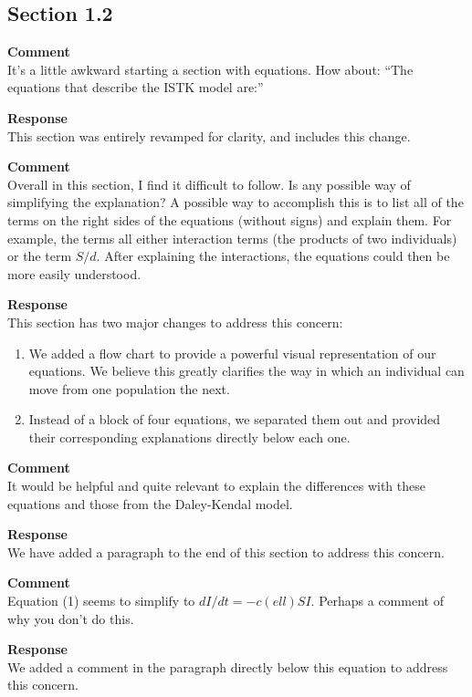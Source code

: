 \subsection{Section 1.2}
\setcounter{rev2-1.3}{1}

\textbf{Comment } \\
It’s a little awkward starting a section with equations. How about: ``The equations that describe the ISTK model are:''

\textbf{Response } \\
This section was entirely revamped for clarity, and includes this change.

\textbf{Comment } \\
Overall in this section, I find it difficult to follow.
Is any possible way of simplifying the explanation?
A possible way to accomplish this is to list all of the terms on the right sides of the equations (without signs) and explain them.
For example, the terms all either interaction terms (the products of two individuals) or the term $ S/d $.
After explaining the interactions, the equations could then be more easily understood.

\textbf{Response } \\
This section has two major changes to address this concern:
\begin{enumerate}
    \item We added a flow chart to provide a powerful visual representation of our equations.
    We believe this greatly clarifies the way in which an individual can move from one population the next.
    \item Instead of a block of four equations, we separated them out and provided their corresponding explanations directly below each one.
\end{enumerate}

\textbf{Comment } \\
It would be helpful and quite relevant to explain the differences with these equations and those from the Daley-Kendal model.

\textbf{Response } \\
We have added a paragraph to the end of this section to address this concern.

\textbf{Comment } \\
Equation (1) seems to simplify to $ dI/dt = -c(ell) S I $. Perhaps a comment of why you don't do this.

\textbf{Response } \\
We added a comment in the paragraph directly below this equation to address this concern.

